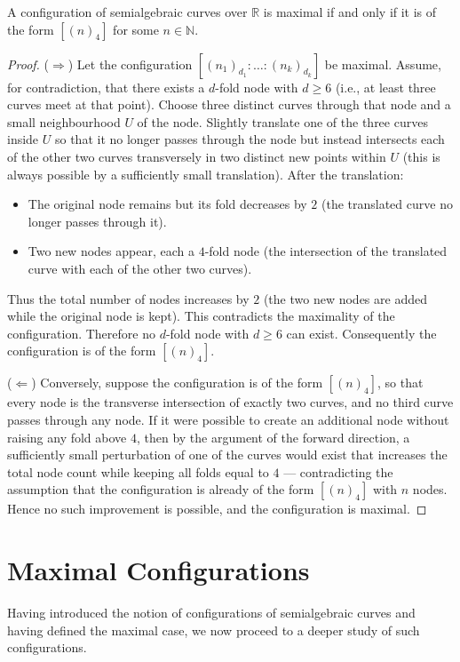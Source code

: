 \documentclass[article,11pt]{amsart} \numberwithin{equation}{section}
\numberwithin{equation}{section}
\begin{document}
{\begin{thm}\label{mainthm}
	A configuration of semialgebraic curves over $\mathbb{R}$ is maximal if and only if it is of the form $[(n)_4]$ for some $n\in\mathbb{N}$.
\end{thm}

\begin{proof}
	($\Rightarrow$) Let the configuration $[(n_1)_{d_1}:\dots:(n_k)_{d_k}]$ be maximal. Assume, for contradiction, that there exists a $d$-fold node with $d \ge 6$ (i.e., at least three curves meet at that point). Choose three distinct curves through that node and a small neighbourhood $U$ of the node. Slightly translate one of the three curves inside $U$ so that it no longer passes through the node but instead intersects each of the other two curves transversely in two distinct new points within $U$ (this is always possible by a sufficiently small translation). After the translation:
	\begin{itemize}
		\item The original node remains but its fold decreases by $2$ (the translated curve no longer passes through it).
		\item Two new nodes appear, each a $4$-fold node (the intersection of the translated curve with each of the other two curves).
	\end{itemize}
	Thus the total number of nodes increases by $2$ (the two new nodes are added while the original node is kept). This contradicts the maximality of the configuration. Therefore no $d$-fold node with $d \ge 6$ can exist. Consequently the configuration is of the form $[(n)_4]$.
	
($\Leftarrow$) Conversely, suppose the configuration is of the 
form $[(n)_4]$, so that every node is the transverse intersection 
of exactly two curves, and no third curve passes through any node. 
If it were possible to create an additional node without raising 
any fold above $4$, then by the argument of the forward direction, 
a sufficiently small perturbation of one of the curves would exist 
that increases the total node count while keeping all folds equal 
to $4$ --- contradicting the assumption that the configuration is 
already of the form $[(n)_4]$ with $n$ nodes. Hence no such 
improvement is possible, and the configuration is maximal.
\end{proof}

\section{Maximal Configurations}
\label{sec3}
Having introduced the notion of configurations of semialgebraic curves and having defined the maximal case, we now proceed to a deeper study of such configurations.

}
\end{document}
